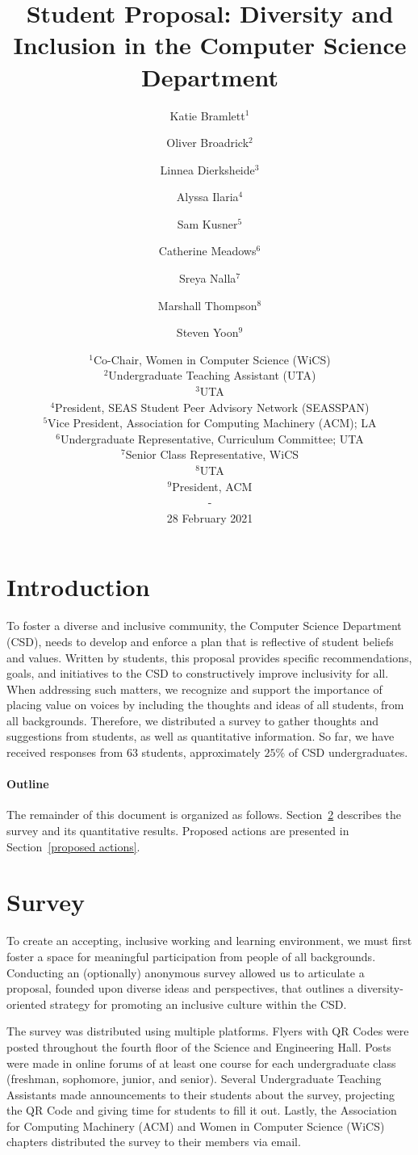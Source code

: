 \documentclass{article}
\title{Student Proposal: Diversity and Inclusion in the Computer Science Department}
\author{
Katie Bramlett$^1$\and
Oliver Broadrick$^2$\and
Linnea Dierksheide$^3$\and
Alyssa Ilaria$^4$\and
Sam Kusner$^5$\and
Catherine Meadows$^6$\and
Sreya Nalla$^7$\and
Marshall Thompson$^8$\and
Steven Yoon$^9$
}
\date{%
    $^1$Co-Chair, Women in Computer Science (WiCS)\\
    $^2$Undergraduate Teaching Assistant (UTA)\\
    $^3$UTA\\
    $^4$President, SEAS Student Peer Advisory Network (SEASSPAN)\\
    $^5$Vice President, Association for Computing Machinery (ACM); LA\\
    $^6$Undergraduate Representative, Curriculum Committee; UTA\\
    $^7$Senior Class Representative, WiCS\\
    $^8$UTA\\
    $^9$President, ACM\\
    -\\
    28 February 2021
}
\begin{document}
\maketitle

\section{Introduction}
To foster a diverse and inclusive community, the Computer Science Department (CSD), 
needs to develop and enforce a plan that is reflective of student beliefs and values.
Written by students, this proposal
provides specific recommendations, goals, and initiatives
to the CSD to constructively improve
inclusivity for all.
When addressing such matters, we recognize and support the importance of 
placing value on voices by including the thoughts and ideas of all students, from all backgrounds.
Therefore, we distributed a survey to gather thoughts and suggestions from students, as well as 
quantitative information. So far, we have
received responses from $63$ students, approximately $25\%$ of CSD undergraduates.

\paragraph{Outline}
The remainder of this document is organized as follows.
Section~\ref{survey} describes the survey and its quantitative results.
Proposed actions are presented in Section~\ref{proposed actions}.

\section{Survey}\label{survey}
To create an accepting, inclusive working and learning environment, we must 
first foster a space for meaningful participation from people of all backgrounds.
Conducting an (optionally) anonymous survey allowed us to articulate a proposal, 
founded upon diverse ideas and perspectives, that outlines a diversity-oriented
strategy for promoting an inclusive culture within the CSD.

The survey was distributed using multiple platforms. Flyers with QR Codes were posted
throughout the fourth floor of the Science and Engineering Hall.
Posts were made in online forums of at least one course
for each undergraduate class (freshman, sophomore, junior, and senior).
Several Undergraduate Teaching Assistants made announcements to their 
students about the survey, projecting the QR Code and giving time
for students to fill it out. Lastly, the Association for Computing Machinery (ACM) and Women 
in Computer Science (WiCS) chapters distributed the survey to their members via email. 
\end{document}
